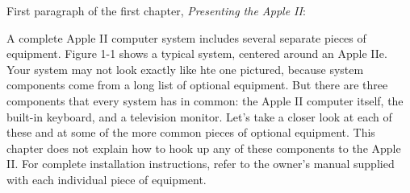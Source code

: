 \documentclass[a4paper,12pt]{article}
\begin{document}
\begin{flushleft}
First paragraph of the first chapter, \textit{Presenting the Apple II}:
\end{flushleft}

\linebreak
\begin{displayquote}
A complete Apple II computer system includes several separate pieces of equipment. Figure 1-1 shows a typical system, centered around an Apple IIe. Your system may not look exactly like hte one pictured, because system components come from a long list of optional equipment. But there are three components that every system has in common: the Apple II computer itself, the built-in keyboard, and a television monitor. Let's take a closer look at each of these and at some of the more common pieces of optional equipment. This chapter does not explain how to hook up any of these components to the Apple II. For complete installation instructions, refer to the owner's manual supplied with each individual piece of equipment.
\end{displayquote}
\end{document}
